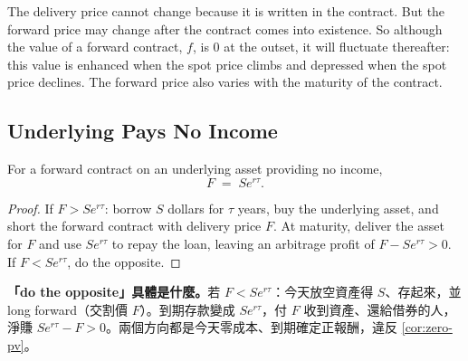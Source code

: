 The delivery price cannot change because it is written in the contract.
But the forward price may change after the contract comes into existence.
So although the value of a forward contract, $f$, is $0$ at the outset, it will fluctuate thereafter: this value is enhanced when the spot price climbs and depressed when the spot price declines.
The forward price also varies with the maturity of the contract.

\suppstart
{}
\suppend

\subsection{Underlying Pays No Income}


\begin{lemma}
	\label{lem:fwd-no-income}
	For a forward contract on an underlying asset providing no income,
	\begin{equation}
		F \;=\; Se^{r\tau} .
		\label{eq:fwd-price}
	\end{equation}
\end{lemma}

\begin{proof}
	If $F>Se^{r\tau}$:
	borrow $S$ dollars for $\tau$ years, buy the underlying asset, and short the forward contract with delivery price $F$.
	At maturity, deliver the asset for $F$ and use $Se^{r\tau}$ to repay the loan, leaving an arbitrage profit of $F-Se^{r\tau}>0$.
	If $F<Se^{r\tau}$, do the opposite.
\end{proof}

\suppstart
{}

\begin{remark}
	\textbf{「do the opposite」具體是什麼。}若 $F<Se^{r\tau}$：今天放空資產得 $S$、存起來，並 long forward（交割價 $F$）。到期存款變成 $Se^{r\tau}$，付 $F$ 收到資產、還給借券的人，淨賺 $Se^{r\tau}-F>0$。兩個方向都是今天零成本、到期確定正報酬，違反 \autoref{cor:zero-pv}。
\end{remark}
\suppend

